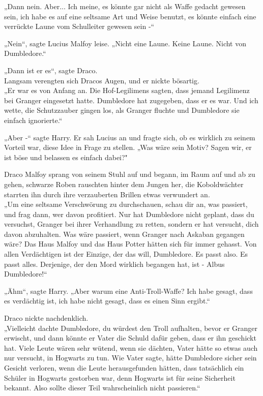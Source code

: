 {„Dann nein. Aber... Ich meine, es könnte gar nicht als Waffe gedacht gewesen sein, ich habe es auf eine seltsame Art und Weise benutzt, es könnte einfach eine verrückte Laune vom Schulleiter gewesen sein -“

„Nein“, sagte Lucius Malfoy leise. „Nicht eine Laune. Keine Laune. Nicht von Dumbledore.“

„Dann ist er es“, sagte Draco.\\ Langsam verengten sich Dracos Augen, und er nickte bösartig.\\ „Er war es von Anfang an. Die Hof-Legilimens sagten, dass jemand Legilimenz bei Granger eingesetzt hatte. Dumbledore hat zugegeben, dass er es war. Und ich wette, die Schutzzauber gingen los, als Granger fluchte und Dumbledore sie einfach ignorierte.“

„Aber -“ sagte Harry. Er sah Lucius an und fragte sich, ob es wirklich zu seinem Vorteil war, diese Idee in Frage zu stellen. „Was wäre sein Motiv? Sagen wir, er ist böse und belassen es einfach dabei?"

Draco Malfoy sprang von seinem Stuhl auf und begann, im Raum auf und ab zu gehen, schwarze Roben rauschten hinter dem Jungen her, die Koboldwächter starrten ihn durch ihre verzauberten Brillen etwas verwundert an.\\ „Um eine seltsame Verschwörung zu durchschauen, schau dir an, was passiert, und frag dann, wer davon profitiert. Nur hat Dumbledore nicht geplant, dass du versuchst, Granger bei ihrer Verhandlung zu retten, sondern er hat versucht, dich davon abzuhalten. Was wäre passiert, wenn Granger nach Askaban gegangen wäre? Das Haus Malfoy und das Haus Potter hätten sich für immer gehasst. Von allen Verdächtigen ist der Einzige, der das will, Dumbledore. Es passt also. Es passt alles. Derjenige, der den Mord wirklich begangen hat, ist - Albus Dumbledore!“

„Ähm“, sagte Harry. „Aber warum eine Anti-Troll-Waffe? Ich habe gesagt, dass es verdächtig ist, ich habe nicht gesagt, dass es einen Sinn ergibt.“

Draco nickte nachdenklich.\\ „Vielleicht dachte Dumbledore, du würdest den Troll aufhalten, bevor er Granger erwischt, und dann könnte er Vater die Schuld dafür geben, dass er ihn geschickt hat. Viele Leute wären sehr wütend, wenn sie dächten, Vater hätte so etwas auch nur versucht, in Hogwarts zu tun. Wie Vater sagte, hätte Dumbledore sicher sein Gesicht verloren, wenn die Leute herausgefunden hätten, dass tatsächlich ein Schüler in Hogwarts gestorben war, denn Hogwarts ist für seine Sicherheit bekannt. Also sollte dieser Teil wahrscheinlich nicht passieren.“

}
